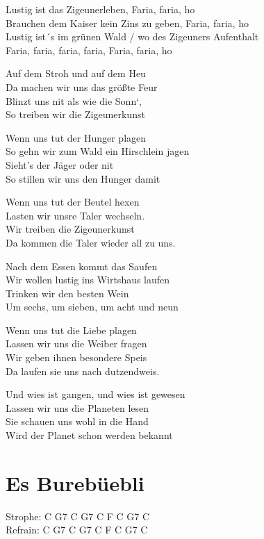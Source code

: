 \documentclass[
  letterpaper,
]{scrbook}
\begin{document}
Lustig ist das Zigeunerleben, Faria, faria, ho\\
Brauchen dem Kaiser kein Zins zu geben, Faria, faria, ho\\
Lustig ist´s im grünen Wald / wo des Zigeuners Aufenthalt\\
Faria, faria, faria, faria, Faria, faria, ho

Auf dem Stroh und auf dem Heu\\
Da machen wir uns das größte Feur\\
Blinzt uns nit als wie die Sonn`,\\
So treiben wir die Zigeunerkunst

Wenn uns tut der Hunger plagen\\
So gehn wir zum Wald ein Hirschlein jagen\\
Sieht's der Jäger oder nit\\
So stillen wir uns den Hunger damit

Wenn uns tut der Beutel hexen\\
Lasten wir unsre Taler wechseln.\\
Wir treiben die Zigeunerkunst\\
Da kommen die Taler wieder all zu uns.

Nach dem Essen kommt das Saufen\\
Wir wollen lustig ins Wirtshaus laufen\\
Trinken wir den besten Wein\\
Um sechs, um sieben, um acht und neun

Wenn uns tut die Liebe plagen\\
Lassen wir uns die Weiber fragen\\
Wir geben ihnen besondere Speis\\
Da laufen sie uns nach dutzendweis.

Und wies ist gangen, und wies ist gewesen\\
Lassen wir uns die Planeten lesen\\
Sie schauen uns wohl in die Hand\\
Wird der Planet schon werden bekannt

\hypertarget{es-burebuxfcebli}{%
\chapter{Es Burebüebli}\label{es-burebuxfcebli}}

Strophe: C G7 C G7 C F C G7 C\\
Refrain: C G7 C G7 C F C G7 C
\end{document}
